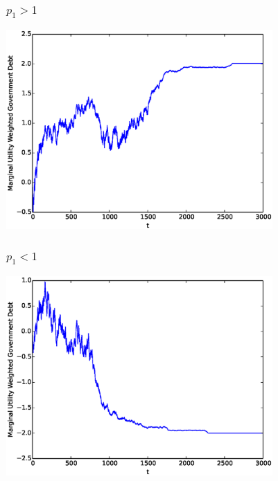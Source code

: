 \documentclass{beamer}
\begin{document}
\begin{frame}
	\frametitle{$p_1 > 1$}
	\begin{center}
	\includegraphics[width=4in]{Images/port1.eps}
	\end{center}
\end{frame}

\begin{frame}
	\frametitle{$p_1 < 1$}
	\begin{center}
	\includegraphics[width=4in]{Images/port2.eps}
	\end{center}
\end{frame}
\end{document}
